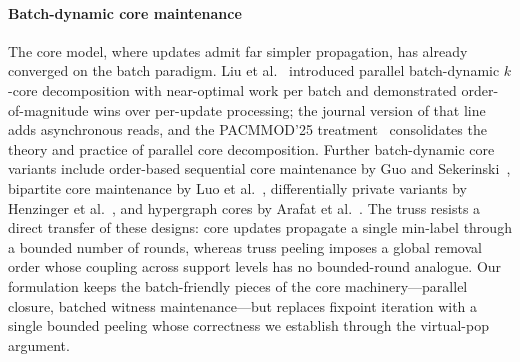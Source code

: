 \paragraph{Batch-dynamic core maintenance}
The core model, where updates admit far simpler propagation, has already converged on the batch paradigm.
Liu et al.~\cite{liu2022parallel} introduced parallel batch-dynamic $k$-core decomposition with near-optimal work per batch and demonstrated order-of-magnitude wins over per-update processing; the journal version of that line~\cite{liu2024parallel} adds asynchronous reads, and the PACMMOD'25 treatment~\cite{liu2025parallel} consolidates the theory and practice of parallel core decomposition.
Further batch-dynamic core variants include order-based sequential core maintenance by Guo and Sekerinski~\cite{guo2022parallel}, bipartite core maintenance by Luo et al.~\cite{luo2023efficient}, differentially private variants by Henzinger et al.~\cite{henzinger2024tighter}, and hypergraph cores by Arafat et al.~\cite{arafat2023neighborhoodbased}.
The truss resists a direct transfer of these designs: core updates propagate a single min-label through a bounded number of rounds, whereas truss peeling imposes a global removal order whose coupling across support levels has no bounded-round analogue.
Our formulation keeps the batch-friendly pieces of the core machinery---parallel closure, batched witness maintenance---but replaces fixpoint iteration with a single bounded peeling whose correctness we establish through the virtual-pop argument.

